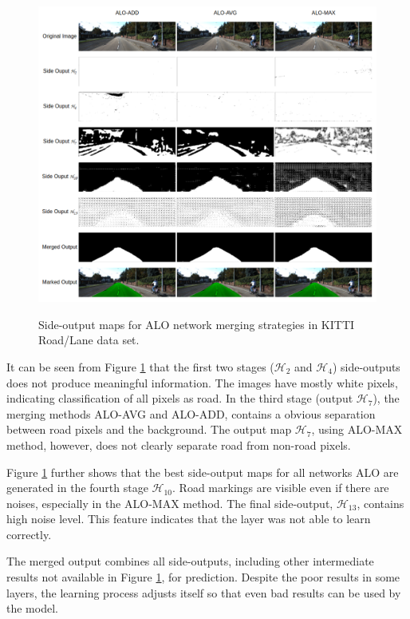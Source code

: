 \begin{figure}
  \centering
  \caption{Side-output maps for ALO network merging strategies in KITTI Road/Lane data set.}
  \includegraphics[width=1\columnwidth]{../imagens/ilustracoes/cap6_kitti_side_outputs.png}
  \sourceOwn
  \label{fig:kitti_side_outputs}
\end{figure}

It can be seen from Figure \ref{fig:kitti_side_outputs} that the first two stages ($\mathcal{H}_2$ and $\mathcal{H}_4$) side-outputs does not produce meaningful information.
The images have mostly white pixels, indicating classification of all pixels as road.
In the third stage (output $\mathcal{H}_7$), the merging methods ALO-AVG and ALO-ADD, contains a obvious separation between road pixels and the background.
The output map $\mathcal{H}_7$, using ALO-MAX method, however, does not clearly separate road from non-road pixels.

Figure \ref{fig:kitti_side_outputs} further shows that the best side-output maps for all networks ALO are generated in the fourth stage $\mathcal{H}_{10}$. 
Road markings are visible even if there are noises, especially in the ALO-MAX method.
The final side-output, $\mathcal{H}_{13}$, contains high noise level.
This feature indicates that the layer was not able to learn correctly.

The merged output combines all side-outputs, including other intermediate results not available in Figure \ref{fig:kitti_side_outputs}, for prediction.
Despite the poor results in some layers, the learning process adjusts itself so that even bad results can be used by the model.

